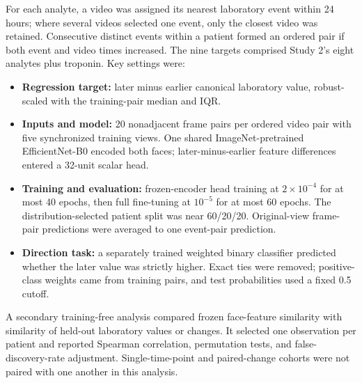 \documentclass[10pt,a4paper]{article}
\begin{document}
For each analyte, a video was assigned its nearest laboratory event within 24 hours; where several videos selected one event, only the closest video was retained. Consecutive distinct events within a patient formed an ordered pair if both event and video times increased. The nine targets comprised Study 2's eight analytes plus troponin. Key settings were:
\begin{itemize}
\setlength{\itemsep}{1pt}
\item \textbf{Regression target:} later minus earlier canonical laboratory value, robust-scaled with the training-pair median and IQR.
\item \textbf{Inputs and model:} 20 nonadjacent frame pairs per ordered video pair with five synchronized training views. One shared ImageNet-pretrained EfficientNet-B0 encoded both faces; later-minus-earlier feature differences entered a 32-unit scalar head.
\item \textbf{Training and evaluation:} frozen-encoder head training at $2\times10^{-4}$ for at most 40 epochs, then full fine-tuning at $10^{-5}$ for at most 60 epochs. The distribution-selected patient split was near 60/20/20. Original-view frame-pair predictions were averaged to one event-pair prediction.
\item \textbf{Direction task:} a separately trained weighted binary classifier predicted whether the later value was strictly higher. Exact ties were removed; positive-class weights came from training pairs, and test probabilities used a fixed 0.5 cutoff.
\end{itemize}

\begin{center}
\begin{minipage}{\linewidth}
\centering

\label{fig:pairarch}
\end{minipage}
\end{center}

A secondary training-free analysis compared frozen face-feature similarity with similarity of held-out laboratory values or changes. It selected one observation per patient and reported Spearman correlation, permutation tests, and false-discovery-rate adjustment. Single-time-point and paired-change cohorts were not paired with one another in this analysis.
\end{document}
